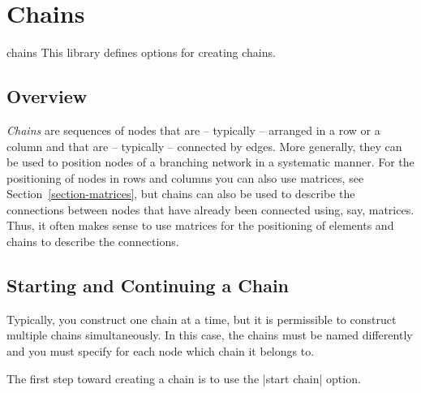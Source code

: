 %
%
%


\section{Chains}

\label{section-chains}

\begin{tikzlibrary}{chains}
  This library defines options for creating chains.
\end{tikzlibrary}


\subsection{Overview}

\emph{Chains} are sequences of nodes that are -- typically -- arranged
in a row or a column and that are -- typically -- connected by
edges. More generally, they can be used to position nodes of a
branching network in a systematic manner. For the positioning of nodes
in rows and columns you can also use matrices, see
Section~\ref{section-matrices}, but chains can also be used
to describe the connections between nodes that have already been
connected using, say, matrices. Thus, it often makes sense to use
matrices for the positioning of elements and chains to describe the
connections.



\subsection{Starting and Continuing a Chain}

Typically, you construct one chain at a time, but it is
permissible to construct multiple chains simultaneously. In this
case, the chains must be named differently and you must specify for
each node which chain it belongs to.

The first step toward creating a chain is to use the |start chain|
option.

